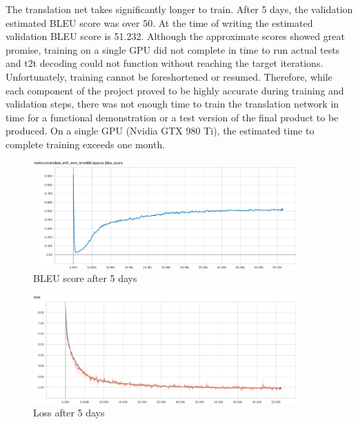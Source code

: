 \documentclass[10pt,a4paper]{article}
\begin{document}
\clearpage
  
The translation net takes significantly longer to train. After 5 days, the validation estimated BLEU score was over 50. At the time of writing the estimated validation BLEU score is 51.232. Although the approximate scores showed great promise, training on a single GPU did not complete in time to run actual tests and t2t decoding could not function without reaching the target iterations. Unfortunately, training cannot be foreshortened or resumed. Therefore, while each component of the project proved to be highly accurate during training and validation steps, there was not enough time to train the translation network in time for a functional demonstration or a test version of the final product to be produced. On a single GPU (Nvidia GTX 980 Ti), the estimated time to complete training exceeds one month.


\begin{figure}[H]
  \begin{center}
    \includegraphics[width=0.9\textwidth] {BLEU.png}
    \caption{BLEU score after 5 days}
  \end{center}
\end{figure}


\begin{figure}[H]
  \begin{center}
    \includegraphics[width=0.9\textwidth] {loss.png}
    \caption{Loss after 5 days}
  \end{center}
\end{figure}
\end{document}
